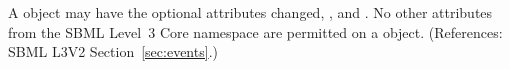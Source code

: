 A \Priority object may have the optional attributes  changed{, ,}  and
.  No other attributes from the SBML Level~3 Core namespace
are permitted on a \Priority object.  (References: SBML L3V2
Section~\ref{sec:events}.)
